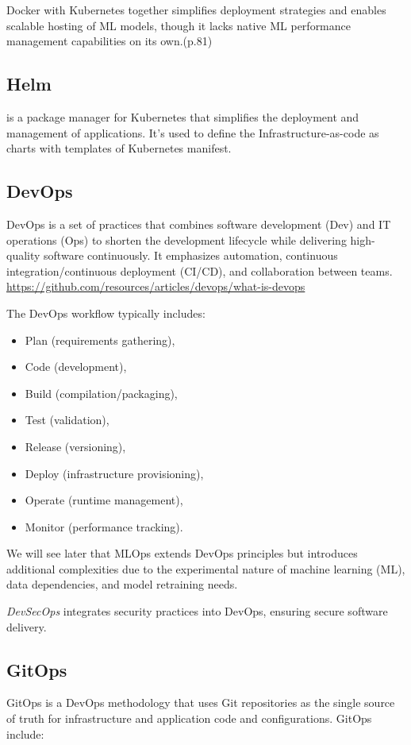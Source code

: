 Docker with Kubernetes together simplifies deployment strategies and enables scalable hosting of ML models,
though it lacks native ML performance management capabilities on its own.\cite{treveil2020introducing}(p.81)

\subsection{Helm}\label{subsec:helm}
is a package manager for Kubernetes that simplifies the deployment and management of applications\cite{9792270}.
It's used to define the Infrastructure-as-code as charts with templates of Kubernetes manifest.

\subsection{DevOps}\label{subsec:devops}
DevOps is a set of practices that combines software development (Dev) and IT
operations (Ops) to shorten the development lifecycle while delivering
high-quality software continuously.
It emphasizes automation, continuous integration/continuous deployment (CI/CD), and collaboration between
teams. \url{https://github.com/resources/articles/devops/what-is-devops}

The DevOps workflow typically includes:

\begin{itemize}
    \item Plan (requirements gathering),
    \item Code (development),
    \item Build (compilation/packaging),
    \item Test (validation),
    \item Release (versioning),
    \item Deploy (infrastructure provisioning),
    \item Operate (runtime management),
    \item Monitor (performance tracking).
\end{itemize}
We will see later that MLOps
 extends DevOps principles but introduces additional complexities due to
 the experimental nature of machine learning (ML), data dependencies,
and model retraining needs.

\textit{DevSecOps} integrates security practices into DevOps, ensuring secure software delivery.

\subsection{GitOps}\label{subsec:gitops}
GitOps is a DevOps methodology that uses Git repositories as the single source of truth for infrastructure and application code and configurations\cite{inproceedings}.
GitOps include:

